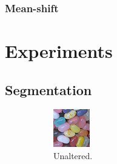 \documentclass[12pt]{article}
\begin{document}
\subsubsection{Mean-shift}


\section{Experiments}

\subsection{Segmentation}

\begin{figure}
    \centering
  \begin{subfigure}[b]{0.3\textwidth}
      \includegraphics[width=\textwidth]{fig/img3}
      \caption{Unaltered.}
  \end{subfigure}
   \begin{subfigure}[b]{0.3\textwidth}

\end{subfigure}
\end{figure}
\end{document}
